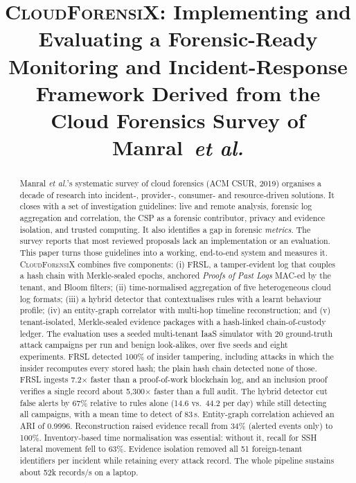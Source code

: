 \documentclass[conference,10pt]{IEEEtran}
\newcommand{\ours}{\textsc{CloudForensiX}}
\begin{document}
\title{\ours: Implementing and Evaluating a Forensic-Ready Monitoring and Incident-Response Framework Derived from the Cloud Forensics Survey of Manral~\textit{et al.}}

\author{
}

\maketitle

\begin{abstract}
Manral \textit{et al.}'s systematic survey of cloud forensics (ACM CSUR, 2019) organises a decade of research into incident-, provider-, consumer- and resource-driven solutions. It closes with a set of investigation guidelines: live and remote analysis, forensic log aggregation and correlation, the CSP as a forensic contributor, privacy and evidence isolation, and trusted computing. It also identifies a gap in forensic \emph{metrics}. The survey reports that most reviewed proposals lack an implementation or an evaluation. This paper turns those guidelines into a working, end-to-end system and measures it. \ours{} combines five components:
(i) FRSL, a tamper-evident log that couples a hash chain with Merkle-sealed epochs, anchored \emph{Proofs of Past Logs} MAC-ed by the tenant, and Bloom filters;
(ii) time-normalised aggregation of five heterogeneous cloud log formats;
(iii) a hybrid detector that contextualises rules with a learnt behaviour profile;
(iv) an entity-graph correlator with multi-hop timeline reconstruction; and
(v) tenant-isolated, Merkle-sealed evidence packages with a hash-linked chain-of-custody ledger.
The evaluation uses a seeded multi-tenant IaaS simulator with 20 ground-truth attack campaigns per run and benign look-alikes, over five seeds and eight experiments.
FRSL detected 100\% of insider tampering, including attacks in which the insider recomputes every stored hash; the plain hash chain detected none of those. FRSL ingests 7.2$\times$ faster than a proof-of-work blockchain log, and an inclusion proof verifies a single record about 5,300$\times$ faster than a full audit.
The hybrid detector cut false alerts by 67\% relative to rules alone (14.6 vs.\ 44.2 per day) while still detecting all campaigns, with a mean time to detect of 83\,s.
Entity-graph correlation achieved an ARI of 0.9996. Reconstruction raised evidence recall from 34\% (alerted events only) to 100\%.
Inventory-based time normalisation was essential: without it, recall for SSH lateral movement fell to 63\%.
Evidence isolation removed all 51 foreign-tenant identifiers per incident while retaining every attack record.
The whole pipeline sustains about 52k records/s on a laptop.
\end{abstract}
\end{document}
